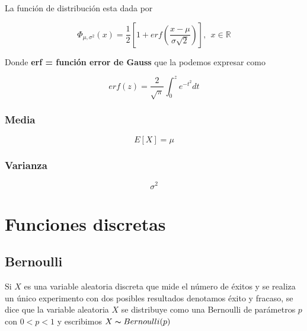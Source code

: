 \documentclass{article}
\begin{document}
                La función de distribución esta dada por

                    \begin{equation*}
                        \Phi _{\mu,\sigma ^2}(x) = \frac{1}{2} \left[ 1+ erf\left( \frac{x-\mu}{\sigma \sqrt{2}} \right) \right], ~~x\in \mathbb{R}
                    \end{equation*}

                Donde {\bf erf = función error de Gauss} que la podemos expresar como

                    \begin{equation*}
                        erf(z) = \frac{2}{\sqrt{\pi}} \int _0^z e^{-t^2} dt
                    \end{equation*}

            \subsubsection{Media}

                \begin{equation*}
                    E[X] = \mu
                \end{equation*}
                
            \subsubsection{Varianza}

                \begin{equation*}
                    \sigma ^2 
                \end{equation*}

    \section{Funciones discretas}

        \subsection{Bernoulli}
            
            Si $X$ es una variable aleatoria discreta que mide el número de éxitos y se realiza un único experimento con dos posibles resultados denotamos éxito y fracaso, se dice que la variable aleatoria $X$ se distribuye como una Bernoulli de parámetros $p$ con $0<p<1$ y escribimos   $X\thicksim Bernoulli (p)$
            
\end{document}
